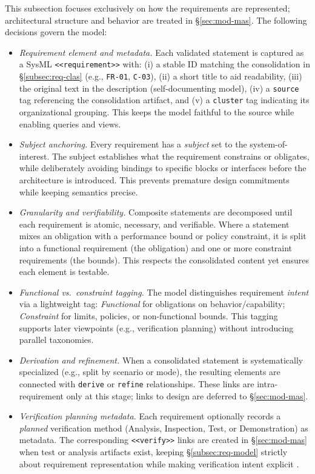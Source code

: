 This subsection focuses exclusively on how the requirements are represented; architectural structure and behavior are treated in §\ref{sec:mod-mas}. The following decisions govern the model:
\begin{itemize}
  \item \emph{Requirement element and metadata.} Each validated statement is captured as a SysML \texttt{<<requirement>>} with: (i) a stable ID matching the consolidation in §\ref{subsec:req-clas} (e.g., \texttt{FR-01}, \texttt{C-03}), (ii) a short title to aid readability, (iii) the original text in the description (self-documenting model), (iv) a \texttt{source} tag referencing the consolidation artifact, and (v) a \texttt{cluster} tag indicating its organizational grouping. This keeps the model faithful to the source while enabling queries and views.
  \item \emph{Subject anchoring.} Every requirement has a \emph{subject} set to the system-of-interest. The subject establishes what the requirement constrains or obligates, while deliberately avoiding bindings to specific blocks or interfaces before the architecture is introduced. This prevents premature design commitments while keeping semantics precise.
  \item \emph{Granularity and verifiability.} Composite statements are decomposed until each requirement is atomic, necessary, and verifiable. Where a statement mixes an obligation with a performance bound or policy constraint, it is split into a functional requirement (the obligation) and one or more constraint requirements (the bounds). This respects the consolidated content yet ensures each element is testable.
  \item \emph{Functional vs.\ constraint tagging.} The model distinguishes requirement \emph{intent} via a lightweight tag: \emph{Functional} for obligations on behavior/capability; \emph{Constraint} for limits, policies, or non-functional bounds. This tagging supports later viewpoints (e.g., verification planning) without introducing parallel taxonomies.
  \item \emph{Derivation and refinement.} When a consolidated statement is systematically specialized (e.g., split by scenario or mode), the resulting elements are connected with \texttt{derive} or \texttt{refine} relationships. These links are intra-requirement only at this stage; links to design are deferred to §\ref{sec:mod-mas}.
  \item \emph{Verification planning metadata.} Each requirement optionally records a \emph{planned} verification method (Analysis, Inspection, Test, or Demonstration) as metadata. The corresponding \texttt{<<verify>>} links are created in §\ref{sec:mod-mas} when test or analysis artifacts exist, keeping §\ref{subsec:req-model} strictly about requirement representation while making verification intent explicit \parencite{IEEEStandard1990}.

\end{itemize}
